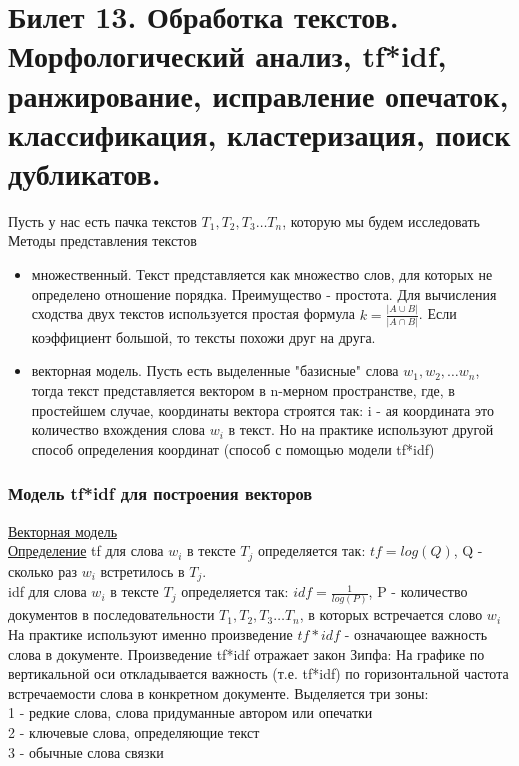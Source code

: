 \newpage
\section {Билет 13. Обработка текстов. Морфологический анализ, tf*idf, ранжирование, исправление опечаток, классификация, кластеризация, поиск дубликатов.}

Пусть у нас есть пачка текстов $T_1, T_2, T_3 \dots T_n$, которую мы будем исследовать \\
Методы представления текстов
\begin{itemize}
\item множественный. Текст представляется как множество слов, для которых не определено отношение порядка. Преимущество - простота. Для вычисления сходства двух текстов используется простая формула $k = \frac {|A \cup B|}{|A \cap B|}$. Если коэффициент большой, то тексты похожи друг на друга.
\item векторная модель. Пусть есть выделенные  "базисные" слова $w_1, w_2, \dots w_n$, тогда текст представляется вектором в n-мерном пространстве, где, в простейшем случае, координаты вектора строятся так: i - ая координата это количество вхождения слова $w_i$ в текст. Но на практике используют другой способ определения координат (способ с помощью модели tf*idf)  
\end{itemize}

\subsubsection {Модель tf*idf для построения векторов}
\href{https://clck.ru/EqWAS}{Векторная модель} \\
\underline {Определение}
tf для слова $w_i$ в тексте $T_j$ определяется так: 
 $tf = log (Q)$, Q - сколько раз $w_i$ встретилось в $T_j$.  \\
idf для слова $w_i$ в тексте $T_j$ определяется так: 
$idf = \frac{1}{log(P)}$, P - количество документов в последовательности $T_1, T_2, T_3 \dots T_n$, в которых встречается слово $w_i$ \\
На практике используют именно произведение $tf*idf$ - означающее важность слова в документе. Произведение tf*idf отражает закон Зипфа:
На графике по вертикальной оси откладывается важность (т.е. tf*idf) по горизонтальной частота встречаемости слова в конкретном документе. 
Выделяется три зоны: \\
1 - редкие слова, слова придуманные автором или опечатки \\
2 - ключевые слова, определяющие текст \\
3 - обычные слова связки \\

